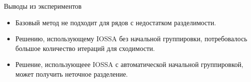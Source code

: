 \documentclass[ucs, notheorems, handout]{beamer}
\begin{document}
\begin{frame}{Выводы из экспериментов}
    \begin{itemize}
        \item Базовый метод не подходит для рядов с недостатком разделимости.
        \item Решению, использующему IOSSA без начальной группировки, потребовалось большое количество итераций для сходимости.
        \item Решение, использующеее IOSSA с автоматической начальной группировкой, может получить неточное разделение.
    \end{itemize}
\end{frame}
	\note
	
\end{document}

